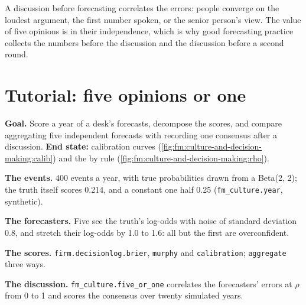 A discussion before forecasting correlates the errors: people converge on the loudest argument, the first number spoken, or the senior person's
view. The value of five opinions is in their independence, which is why good forecasting practice collects the numbers before the discussion and
the discussion before a second round.

\section{Tutorial: five opinions or one}\label{tut:fm:culture-and-decision-making:tut}

\begin{tutorial}
\textbf{Goal.} Score a year of a desk's forecasts, decompose the scores, and compare aggregating five independent forecasts with recording one
consensus after a discussion. \textbf{End state:} calibration curves (\cref{fig:fm:culture-and-decision-making:calib}) and the  by rule
(\cref{fig:fm:culture-and-decision-making:rho}).
\begin{tutsteps}
\item \textbf{The events.} 400 events a year, with true probabilities drawn from a Beta(2, 2); the truth itself scores 0.214, and a constant
one half 0.25 (\texttt{fm\_culture.year}, synthetic).
\item \textbf{The forecasters.} Five see the truth's log-odds with noise of standard deviation 0.8, and stretch their log-odds by 1.0 to 1.6: all
but the first are overconfident.
\item \textbf{The scores.} \texttt{firm.decisionlog.brier}, \texttt{murphy} and \texttt{calibration}; \texttt{aggregate} three ways.
\item \textbf{The discussion.} \texttt{fm\_culture.five\_or\_one} correlates the forecasters' errors at $\rho$ from 0 to 1 and scores the consensus
over twenty simulated years.
\end{tutsteps}
\end{tutorial}

